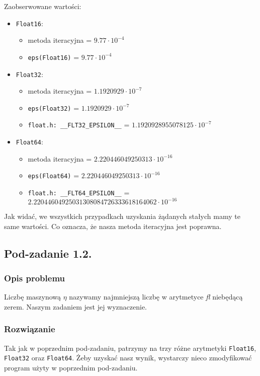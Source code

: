 \documentclass[10pt]{article}
\begin{document}
Zaobserwowane wartości:
\begin{itemize}
    \item \texttt{Float16}:
    \begin{itemize}
        \item metoda iteracyjna = $9.77 \cdot 10^{-4}$
        \item \texttt{eps(Float16)} = $9.77 \cdot 10^{-4}$
    \end{itemize}
    \item \texttt{Float32}:
    \begin{itemize}
        \item metoda iteracyjna = $1.1920929 \cdot 10^{-7}$
        \item \texttt{eps(Float32)} = $1.1920929 \cdot 10^{-7}$
        \item \texttt{float.h: \_\_FLT32\_EPSILON\_\_} = $1.1920928955078125 \cdot 10^{-7}$
    \end{itemize}
    \item \texttt{Float64}:
    \begin{itemize}
        \item metoda iteracyjna = $2.220446049250313 \cdot 10^{-16}$
        \item \texttt{eps(Float64)} = $2.220446049250313 \cdot 10^{-16}$
        \item \texttt{float.h: \_\_FLT64\_EPSILON\_\_} = $2.22044604925031308084726333618164062 \cdot 10^{-16}$
    \end{itemize}
\end{itemize}

Jak widać, we wszystkich przypadkach uzyskania żądanych stałych mamy te same wartości. Co oznacza, że nasza metoda iteracyjna jest poprawna.

\subsection{Pod-zadanie 1.2.}

\subsubsection{Opis problemu}
Liczbę maszynową $\eta$ nazywamy najmniejszą liczbę w arytmetyce \textit{fl} niebędącą zerem. Naszym zadaniem jest jej wyznaczenie.

\subsubsection{Rozwiązanie}
Tak jak w poprzednim pod-zadaniu, patrzymy na trzy różne arytmetyki \texttt{Float16}, \texttt{Float32} oraz \texttt{Float64}. Żeby uzyskać nasz wynik, wystarczy nieco zmodyfikować program użyty w poprzednim pod-zadaniu.
\end{document}
